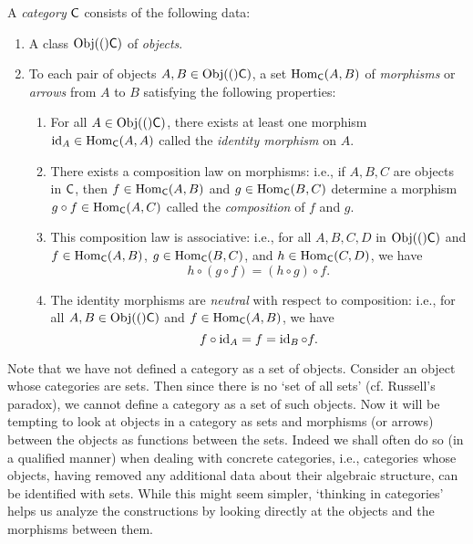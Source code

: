 
\begin{definition}[Category]
    A \emph{category} \(\mathsf{C}\) consists of the following data:
    \begin{enumerate}[label=(\alph*), itemsep=0pt]
        \item A class \(\operatorname{Obj}(\mathsf{(})\mathsf{C})\) of \emph{objects}.
        \item To each pair of objects \(A, B \in \operatorname{Obj}(\mathsf{(})\mathsf{C})\), a set
        \(\operatorname{Hom}_{\mathsf{C}}(A, B)\) of \emph{morphisms} or \emph{arrows} from
        \(A\) to \(B\) satisfying the following properties:
        \begin{enumerate}[label=(\roman*), itemsep=0pt]
            \item For all \(A \in \operatorname{Obj}(\mathsf{(})\mathsf{C})\), there exists at least one
            morphism \(\operatorname{id}_A \in \operatorname{Hom}_{\mathsf{C}}(A, A)\) called the
            \emph{identity morphism} on \(A\).
            
            \item There exists a composition law on morphisms: i.e., if \(A, B,
            C\) are objects in \(\mathsf{C}\), then \(f \in \operatorname{Hom}_{\mathsf{C}}(A,
            B)\) and \(g \in \operatorname{Hom}_{\mathsf{C}}(B, C)\) determine a morphism \(g
            \circ f \in \operatorname{Hom}_{\mathsf{C}}(A, C)\) called the \emph{composition} of
            \(f\) and \(g\). 
            
            \item This composition law is associative: i.e., for all \(A, B, C,
            D\) in \(\operatorname{Obj}(\mathsf{(})\mathsf{C})\) and \(f \in \operatorname{Hom}_{\mathsf{C}}(A, B)\), \(g
            \in \operatorname{Hom}_{\mathsf{C}}(B, C)\), and \(h \in \operatorname{Hom}_{\mathsf{C}}(C, D)\), we
            have
            \[
                h \circ (g \circ f) = (h \circ g) \circ f.
            \]

            \item The identity morphisms are \emph{neutral} with respect to
            composition: i.e., for all \(A, B \in \operatorname{Obj}(\mathsf{(})\mathsf{C})\) and \(f \in
            \operatorname{Hom}_{\mathsf{C}}(A, B)\), we have
            \[
                f \circ \operatorname{id}_A = f = \operatorname{id}_B \circ f.
            \]
        \end{enumerate}
    \end{enumerate}
\end{definition}

Note that we have not defined a category as a set of objects. Consider an object
whose categories are sets. Then since there is no `set of all sets' (cf.
Russell's paradox), we cannot define a category as a set of such objects. Now it
will be tempting to look at objects in a category as sets and morphisms (or
arrows) between the objects as functions between the sets. Indeed we shall often
do so (in a qualified manner) when dealing with concrete categories, i.e.,
categories whose objects, having removed any additional data about their
algebraic structure, can be identified with sets. While this might seem simpler,
`thinking in categories' helps us analyze the constructions by looking directly
at the objects and the morphisms between them.

